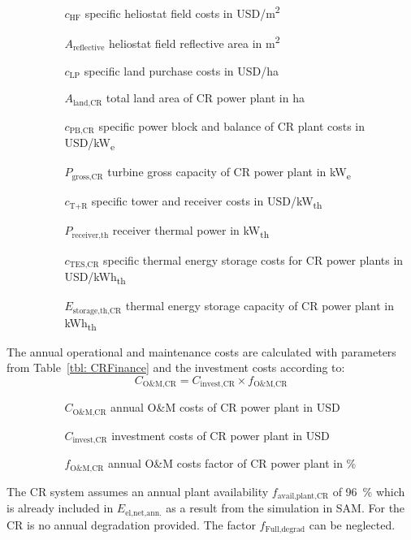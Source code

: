 \begin{itemize}
\item[ ] 
\begin{itemize}
\item[ ] 
\begin{itemize}
\item[$c_{\text{HF}}$]specific heliostat field costs in USD/m\textsuperscript{2}
\item[$A_{\text{reflective}}$]heliostat field reflective area in m\textsuperscript{2}
\item[$c_{\text{LP}}$]specific land purchase costs in USD/ha
\item[$A_{\text{land,CR}}$]total land area of CR power plant in ha
\item[$c_{\text{PB,CR}}$]specific power block and balance of CR plant costs in USD/kW\textsubscript{e}
\item[$P_{\text{gross,CR}}$]turbine gross capacity of CR power plant in kW\textsubscript{e}
\item[$c_{\text{T+R}}$]specific tower and receiver costs in USD/kW\textsubscript{th}
\item[$P_{\text{receiver,th}}$]receiver thermal power in kW\textsubscript{th}
\item[$c_{\text{TES,CR}}$]specific thermal energy storage costs for CR power plants in USD/kWh\textsubscript{th}
\item[$E_{\text{storage,th,CR}}$]thermal energy storage capacity of CR power plant in kWh\textsubscript{th}
\end{itemize}
\end{itemize}
\end{itemize}
The annual operational and maintenance costs are calculated with parameters from Table~\ref{tbl: CRFinance} and the investment costs according to:
\begin{equation}
C_{\text{O\&M,CR}} = C_{\text{invest,CR}} \times f_{\text{O\&M,CR}}
\end{equation} 
\begin{itemize}
\item[ ] 
\begin{itemize}
\item[ ] 
\begin{itemize}
\item[$C_{\text{O\&M,CR}}$]annual O\&M costs of CR power plant in USD
\item[$C_{\text{invest,CR}}$]investment costs of CR power plant in USD
\item[$f_{\text{O\&M,CR}}$]annual O\&M costs factor of CR power plant in \%
\end{itemize}
\end{itemize}
\end{itemize}
The CR system assumes an annual plant availability $f_{\text{avail,plant,CR}}$ of 96~\% which is already included in $E_{\text{el,net,ann.}}$ as a result from the simulation in SAM. For the CR is no annual degradation provided. The factor $f_{\text{Full,degrad}}$ can be neglected.
\pagebreak
